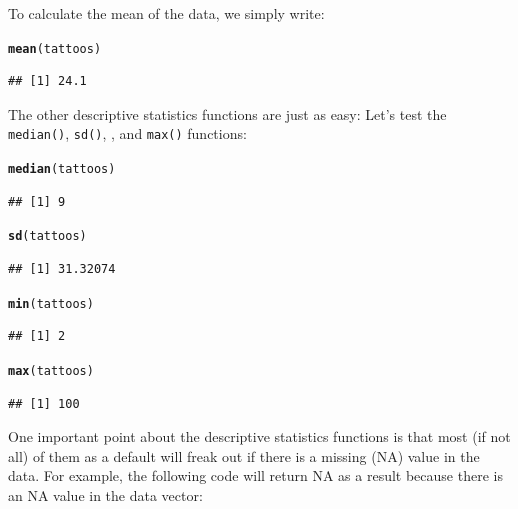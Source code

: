 \documentclass{tufte-book}\usepackage[]{graphicx}\usepackage[]{color}
\makeatletter
\newcommand{\hlstd}[1]{\textcolor[rgb]{0.345,0.345,0.345}{#1}}%
\newcommand{\hlkwd}[1]{\textcolor[rgb]{0.737,0.353,0.396}{\textbf{#1}}}%
\newenvironment{kframe}{%
 \def\at@end@of@kframe{}%
 \ifinner\ifhmode%
  \def\at@end@of@kframe{\end{minipage}}%
  \begin{minipage}{\columnwidth}%
 \fi\fi%
 \def\FrameCommand##1{\hskip\@totalleftmargin \hskip-\fboxsep
 \colorbox{shadecolor}{##1}\hskip-\fboxsep
     \hskip-\linewidth \hskip-\@totalleftmargin \hskip\columnwidth}%
 \MakeFramed {\advance\hsize-\width
   \@totalleftmargin\z@ \linewidth\hsize
   \@setminipage}}%
 {\par\unskip\endMakeFramed%
 \at@end@of@kframe}
\newenvironment{knitrout}{}{} %
\makeatother
\begin{document}
To calculate the mean of the data, we simply write:

\begin{knitrout}
\color{fgcolor}\begin{kframe}
\begin{alltt}
\hlkwd{mean}\hlstd{(tattoos)}
\end{alltt}
\begin{verbatim}
## [1] 24.1
\end{verbatim}
\end{kframe}
\end{knitrout}

The other descriptive statistics functions are just as easy: Let's test the \texttt{median()}, \texttt{sd()}, , and \texttt{max()} functions:

\begin{footnotesize}
\begin{knitrout}
\color{fgcolor}\begin{kframe}
\begin{alltt}
\hlkwd{median}\hlstd{(tattoos)}
\end{alltt}
\begin{verbatim}
## [1] 9
\end{verbatim}
\begin{alltt}
\hlkwd{sd}\hlstd{(tattoos)}
\end{alltt}
\begin{verbatim}
## [1] 31.32074
\end{verbatim}
\begin{alltt}
\hlkwd{min}\hlstd{(tattoos)}
\end{alltt}
\begin{verbatim}
## [1] 2
\end{verbatim}
\begin{alltt}
\hlkwd{max}\hlstd{(tattoos)}
\end{alltt}
\begin{verbatim}
## [1] 100
\end{verbatim}
\end{kframe}
\end{knitrout}
\end{footnotesize}

One important point about the descriptive statistics functions is that most (if not all) of them as a default will freak out if there is a missing (NA) value in the data. For example, the following code will return NA as a result because there is an NA value in the data vector:
\end{document}
